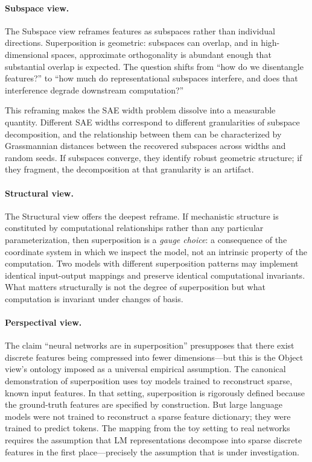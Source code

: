 \documentclass{article}
\begin{document}
\paragraph{Subspace view.}
The Subspace view reframes features as subspaces rather than individual directions. Superposition is geometric: subspaces can overlap, and in high-dimensional spaces, approximate orthogonality is abundant enough that substantial overlap is expected. The question shifts from ``how do we disentangle features?'' to ``how much do representational subspaces interfere, and does that interference degrade downstream computation?''

This reframing makes the SAE width problem dissolve into a measurable quantity. Different SAE widths correspond to different granularities of subspace decomposition, and the relationship between them can be characterized by Grassmannian distances between the recovered subspaces across widths and random seeds. If subspaces converge, they identify robust geometric structure; if they fragment, the decomposition at that granularity is an artifact.

\paragraph{Structural view.}
The Structural view offers the deepest reframe. If mechanistic structure is constituted by computational relationships rather than any particular parameterization, then superposition is a \emph{gauge choice}: a consequence of the coordinate system in which we inspect the model, not an intrinsic property of the computation. Two models with different superposition patterns may implement identical input-output mappings and preserve identical computational invariants. What matters structurally is not the degree of superposition but what computation is invariant under changes of basis.

\paragraph{Perspectival view.}
The claim ``neural networks are in superposition'' presupposes that there exist discrete features being compressed into fewer dimensions---but this is the Object view's ontology imposed as a universal empirical assumption. The canonical demonstration of superposition \citep{elhage2022superposition} uses toy models trained to reconstruct sparse, known input features. In that setting, superposition is rigorously defined because the ground-truth features are specified by construction. But large language models were not trained to reconstruct a sparse feature dictionary; they were trained to predict tokens. The mapping from the toy setting to real networks requires the assumption that LM representations decompose into sparse discrete features in the first place---precisely the assumption that is under investigation.
\end{document}
